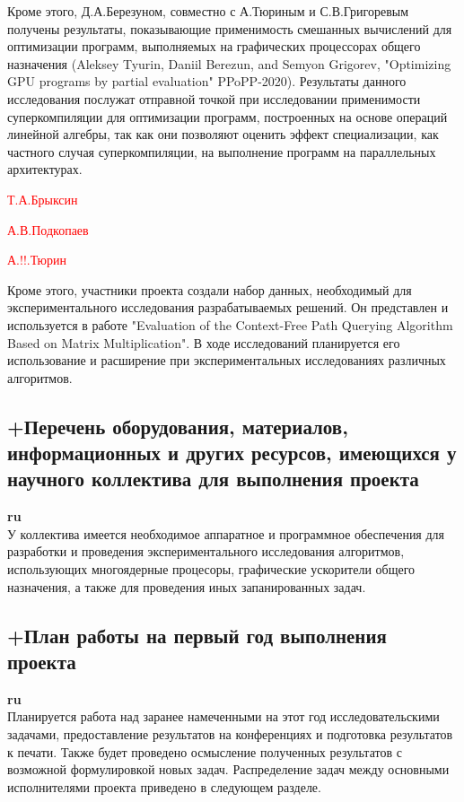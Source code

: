 \documentclass[12pt]{article}  %
\theoremstyle{remark}
\newcommand{\checkme}[1]{\textcolor{red}{#1}}
\begin{document}
Кроме этого, Д.А.Березуном, совместно с А.Тюриным и С.В.Григоревым получены результаты, показывающие применимость смешанных вычислений для оптимизации программ, выполняемых на графических процессорах общего назначения (Aleksey Tyurin, Daniil Berezun, and Semyon Grigorev, "Optimizing GPU programs by partial evaluation" PPoPP-2020). Результаты данного исследования послужат отправной точкой при исследовании применимости суперкомпиляции для оптимизации программ, построенных на основе операций линейной алгебры, так как они позволяют оценить эффект специализации, как частного случая суперкомпиляции, на выполнение программ на параллельных архитектурах.

\checkme{Т.А.Брыксин}

\checkme{А.В.Подкопаев}

\checkme{А.!!.Тюрин}

Кроме этого, участники проекта создали набор данных, необходимый для экспериментального исследования разрабатываемых решений. Он представлен и используется в работе "Evaluation of the Context-Free Path Querying Algorithm Based on Matrix Multiplication". В ходе исследований планируется его использование и расширение при экспериментальных исследованиях различных алгоритмов.


\subsection{+Перечень оборудования, материалов, информационных и других ресурсов, имеющихся у научного коллектива для выполнения проекта}
\textbf{ru}\\
%
У коллектива имеется необходимое аппаратное и программное обеспечения для разработки и проведения экспериментального исследования алгоритмов, использующих многоядерные процесоры, графические ускорители общего назначения, а также для проведения иных запанированных задач.

\subsection{+План работы на первый год выполнения проекта}

\textbf{ru}\\

Планируется работа над заранее намеченными на этот год исследовательскими задачами, предоставление результатов на конференциях и подготовка результатов к печати. Также будет проведено осмысление полученных результатов с возможной формулировкой новых задач. Распределение задач между основными исполнителями проекта приведено в следующем разделе.
\end{document}
